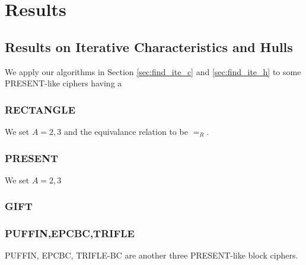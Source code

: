 \section{Results}

\subsection{Results on Iterative Characteristics and Hulls}

We apply our algorithms in Section \ref{sec:find_ite_c} and \ref{sec:find_ite_h} to some PRESENT-like ciphers having a 

\subsubsection{RECTANGLE} We set $A=2,3$ and the equivalance relation to be $=_R$. 

\subsubsection{PRESENT} We set $A=2,3$

\subsubsection{GIFT}

\subsubsection{PUFFIN,EPCBC,TRIFLE} PUFFIN, EPCBC, TRIFLE-BC are another three PRESENT-like block ciphers. 

